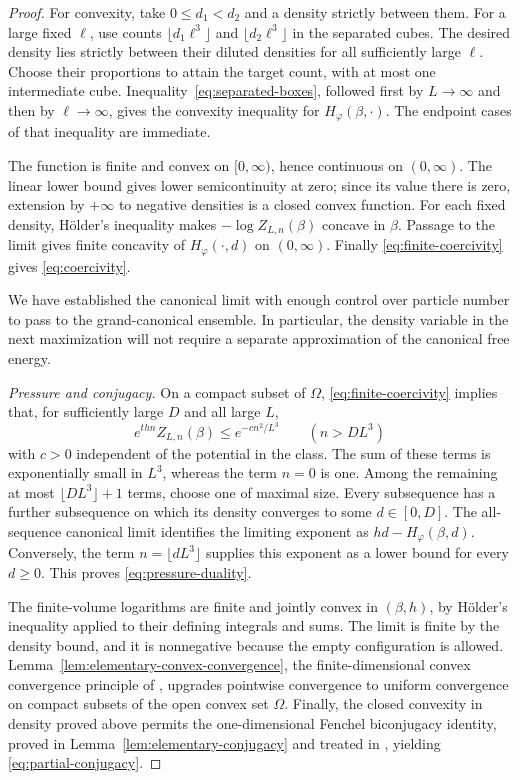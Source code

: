 \begin{proof}
For convexity, take $0\le d_1<d_2$ and a density strictly between
them. For a large fixed $\ell$, use counts
$\lfloor d_1\ell^3\rfloor$ and $\lfloor d_2\ell^3\rfloor$
in the separated cubes. The desired density lies strictly between
their diluted densities for all sufficiently large $\ell$.
Choose their proportions to attain the target count, with at most
one intermediate cube. Inequality~\eqref{eq:separated-boxes},
followed first by $L\to\infty$ and then by $\ell\to\infty$,
gives the convexity inequality for $H_\varphi(\beta,\cdot)$.
The endpoint cases of that inequality are immediate.

The function is finite and convex on $[0,\infty)$, hence continuous
on $(0,\infty)$. The linear lower bound gives lower
semicontinuity at zero; since its value there is zero, extension by
$+\infty$ to negative densities is a closed convex function.
For each fixed density, H\"older's inequality makes
$-\log Z_{L,n}(\beta)$ concave in $\beta$. Passage to the limit
gives finite concavity of $H_\varphi(\cdot,d)$ on $(0,\infty)$.
Finally \eqref{eq:finite-coercivity} gives
\eqref{eq:coercivity}.

We have established the canonical limit with enough control over
particle number to pass to the grand-canonical ensemble. In
particular, the density variable in the next maximization will not
require a separate approximation of the canonical free energy.

\emph{Pressure and conjugacy.}
On a compact subset of $\Omega$, \eqref{eq:finite-coercivity}
implies that, for sufficiently large $D$ and all large $L$,
\[
 e^{thn}Z_{L,n}(\beta)\le e^{-c n^2/L^3}
 \qquad(n>DL^3)
\]
with $c>0$ independent of the potential in the class. The sum of
these terms is exponentially small in $L^3$, whereas the term
$n=0$ is one. Among the remaining at most $\lfloor DL^3\rfloor+1$
terms, choose one of maximal size. Every subsequence has a further
subsequence on which its density converges to some $d\in[0,D]$.
The all-sequence canonical limit identifies the limiting exponent
as $hd-H_\varphi(\beta,d)$. Conversely, the term
$n=\lfloor dL^3\rfloor$ supplies this exponent as a lower bound
for every $d\ge0$. This proves \eqref{eq:pressure-duality}.

The finite-volume logarithms are finite and jointly convex in
$(\beta,h)$, by H\"older's inequality applied to their defining
integrals and sums. The limit is finite by the density bound, and
it is nonnegative because the empty configuration is allowed.
Lemma~\ref{lem:elementary-convex-convergence}, the finite-dimensional
convex convergence principle of \cite[Corollary~7.18]{RockafellarWets1998},
upgrades pointwise convergence
to uniform convergence on compact subsets of the open convex set
$\Omega$.
Finally, the closed convexity in density proved above permits the
one-dimensional Fenchel biconjugacy identity, proved in
Lemma~\ref{lem:elementary-conjugacy} and treated in
\cite[Theorem~11.1]{RockafellarWets1998}, yielding
\eqref{eq:partial-conjugacy}.
\end{proof}

